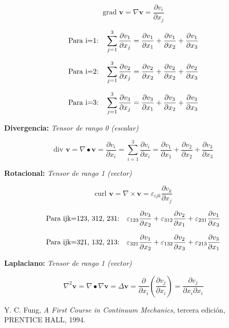 \documentclass[a4paper,12pt,twoside,final,spanish]{article}
\begin{document}
\[
\text{grad }\mathbf{v}=\nabla\mathbf{v}=\frac{\partial v_{i}}{\partial x_{j}}
\]

\[
\text{Para i=1:\quad}\sum_{j=1}^{3}\frac{\partial v_{1}}{\partial x_{j}}=\frac{\partial v_{1}}{\partial x_{1}}+\frac{\partial v_{1}}{\partial x_{2}}+\frac{\partial v_{1}}{\partial x_{3}}
\]

\[
\text{Para i=2:\quad}\sum_{j=1}^{3}\frac{\partial v_{2}}{\partial x_{j}}=\frac{\partial v_{2}}{\partial x_{2}}+\frac{\partial v_{2}}{\partial x_{2}}+\frac{\partial v_{2}}{\partial x_{3}}
\]

\[
\text{Para i=3:\quad}\sum_{j=1}^{3}\frac{\partial v_{3}}{\partial x_{j}}=\frac{\partial v_{3}}{\partial x_{1}}+\frac{\partial v_{3}}{\partial x_{2}}+\frac{\partial v_{3}}{\partial x_{3}}
\]

\textbf{Divergencia:}\textit{ Tensor de rango 0 (escalar)}

\[
\text{div }\mathbf{v}=\nabla\bullet\mathbf{v}=\frac{\partial v_{i}}{\partial x_{i}}=\sum_{i=1}^{3}\frac{\partial v_{i}}{\partial x_{i}}=\frac{\partial v_{1}}{\partial x_{1}}+\frac{\partial v_{2}}{\partial x_{2}}+\frac{\partial v_{3}}{\partial x_{3}}
\]

\textbf{Rotacional:}\textit{ Tensor de rango 1 (vector)}

\[
\text{curl }\mathbf{v}=\nabla\times\mathbf{v}=\varepsilon_{ijk}\frac{\partial v_{k}}{\partial x_{j}}
\]

\[
\text{Para ijk=123, 312, 231:\quad}\varepsilon_{123}\frac{\partial v_{3}}{\partial x_{2}}+\varepsilon_{312}\frac{\partial v_{2}}{\partial x_{1}}+\varepsilon_{231}\frac{\partial v_{1}}{\partial x_{3}}
\]

\[
\text{Para ijk=321, 132, 213:\quad}\varepsilon_{321}\frac{\partial v_{1}}{\partial x_{2}}+\varepsilon_{132}\frac{\partial v_{2}}{\partial x_{3}}+\varepsilon_{213}\frac{\partial v_{3}}{\partial x_{1}}
\]

\textbf{Laplaciano:}\textit{ Tensor de rango 1 (vector)}

\[
\nabla^{2}\mathbf{v}=\nabla\bullet\nabla\mathbf{v}=\Delta\mathbf{v}=\frac{\partial}{\partial x_{i}}\left(\frac{\partial v_{j}}{\partial x_{i}}\right)=\frac{\partial v_{j}}{\partial x_{i}\partial x_{i}}
\]

\begin{thebibliography}{1}
Y. C. Fung,
\emph{A First Course in Continuum Mechanics}, 
tercera edición,
PRENTICE HALL,
1994.
\end{thebibliography}
\end{document}
